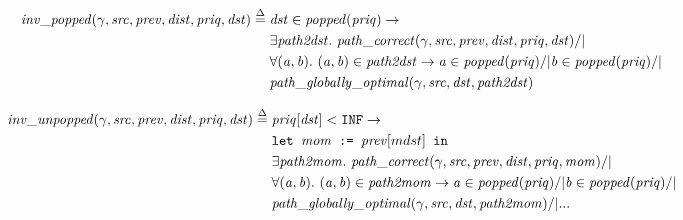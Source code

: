 \begin{figure}
\begin{equation*}
\begin{split}
\m{inv\_popped}(\gamma, \m{src}, \m{prev}, \m{dist}, \m{priq}, \m{dst}) \; \defeq \; &\m{dst} \in \m{popped}(\m{priq}) -> \\
&\exists \m{path2dst}.~\m{path\_correct}(\gamma, \m{src}, \m{prev}, \m{dist}, \m{priq}, \m{dst}) /| \null \\
&\forall \m{(a, b)}.~\m{(a, b)} \in \m{path2dst} -> \m{a} \in \m{popped}(\m{priq}) /| \m{b} \in \m{popped}(\m{priq}) /| \null \\
&\m{path\_globally\_optimal}(\gamma, \m{src}, \m{dst}, \m{path2dst})
\end{split}
\end{equation*}

\begin{equation*}
\begin{split}
\m{inv\_unpopped}(\gamma, \m{src}, \m{prev}, \m{dist}, \m{priq}, \m{dst}) \; \defeq \; &\m{priq}[\m{dst}] < \texttt{INF} -> \\
&\texttt{let } \m{mom} \texttt{ := } \m{prev}[m{dst}] \texttt{ in } \\
&\exists \m{path2mom}.~\m{path\_correct}(\gamma, \m{src}, \m{prev}, \m{dist}, \m{priq}, \m{mom}) /| \null \\
&\forall \m{(a, b)}.~\m{(a, b)} \in \m{path2mom} -> \m{a} \in \m{popped}(\m{priq}) /| \m{b} \in \m{popped}(\m{priq}) /| \null \\
&\m{path\_globally\_optimal}(\gamma, \m{src}, \m{dst}, \m{path2mom}) /|
...
\end{split}
\end{equation*}

\end{figure}

